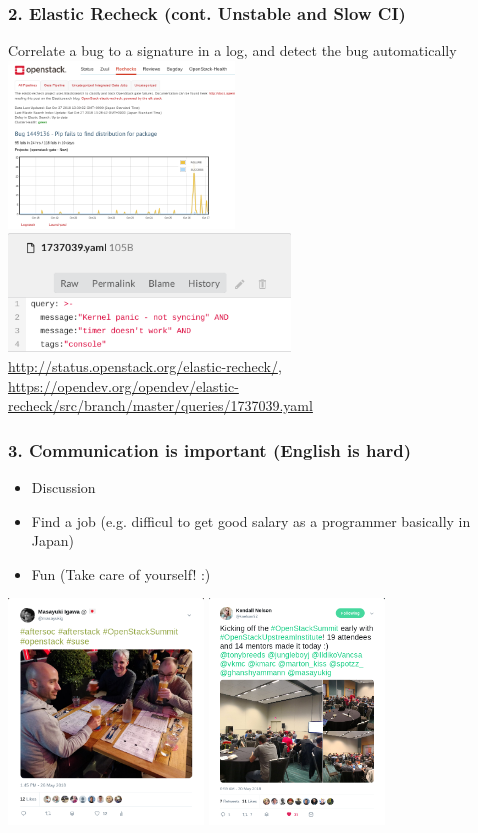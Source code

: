 \documentclass[aspectratio=169,11pt,hyperref={colorlinks=true}]{beamer}
\begin{document}
\begin{frame}
  \frametitle{2. Elastic Recheck (cont. Unstable and Slow CI)}
    Correlate a bug to a signature in a log, and detect the bug automatically
  \centering\includegraphics[width=60mm]{images/elastic-recheck.png}
  \centering\includegraphics[width=75mm]{images/elastic-recheck-source.png}
  \url{http://status.openstack.org/elastic-recheck/},
  \url{https://opendev.org/opendev/elastic-recheck/src/branch/master/queries/1737039.yaml}
\end{frame}

\begin{frame}
  \frametitle{3. Communication is important (English is hard)}
  \begin{itemize}
    \item Discussion
    \item Find a job (e.g. difficul to get good salary as a programmer basically in Japan)
    \item Fun (Take care of yourself! :)
  \end{itemize}
  \centering\includegraphics[height=60mm]{images/tweet-suse.png}
  \centering\includegraphics[height=60mm]{images/tweet-oui.png}
\end{frame}
\end{document}
